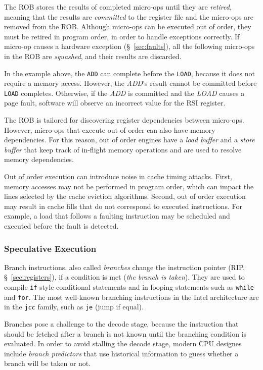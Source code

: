 The ROB stores the results of completed micro-ops until they are
\textit{retired}, meaning that the results are \textit{committed} to the
register file and the micro-ops are removed from the ROB. Although micro-ops
can be executed out of order, they must be retired in program order, in order
to handle exceptions correctly. If micro-op causes a hardware exception
(\S~\ref{sec:faults}), all the following micro-ops in the ROB are
\textit{squashed}, and their results are discarded.

In the example above, the \texttt{ADD} can complete before the \texttt{LOAD},
because it does not require a memory access. However, the \textit{ADD}'s result
cannot be committed before \texttt{LOAD} completes. Otherwise, if the
\textit{ADD} is committed and the \textit{LOAD} causes a page fault, software
will observe an incorrect value for the  RSI register.

The ROB is tailored for discovering register dependencies between micro-ops.
However, micro-ops that execute out of order can also have memory dependencies.
For this reason, out of order engines have a \textit{load buffer} and a
\textit{store buffer} that keep track of in-flight memory operations and are
used to resolve memory dependencies.

Out of order execution can introduce noise in cache timing attacks. First,
memory accesses may not be performed in program order, which can impact the
lines selected by the cache eviction algorithms. Second, out of order execution
may result in cache fills that do not correspond to executed instructions. For
example, a load that follows a faulting instruction may be scheduled and
executed before the fault is detected.


\subsubsection{Speculative Execution}


Branch instructions, also called \textit{branches} change the instruction
pointer (RIP, \S~\ref{sec:registers}), if a condition is met (\textit{the
branch is taken}). They are used to compile \texttt{if}-style conditional
statements and in looping statements such as \texttt{while} and \texttt{for}.
The most well-known branching instructions in the Intel architecture are in the
\texttt{j\textit{cc}} family, such as \texttt{je} (jump if equal).

Branches pose a challenge to the decode stage, because the instruction that
should be fetched after a branch is not known until the branching condition is
evaluated. In order to avoid stalling the decode stage, modern CPU designes
include \textit{branch predictors} that use historical information to guess
whether a branch will be taken or not.

